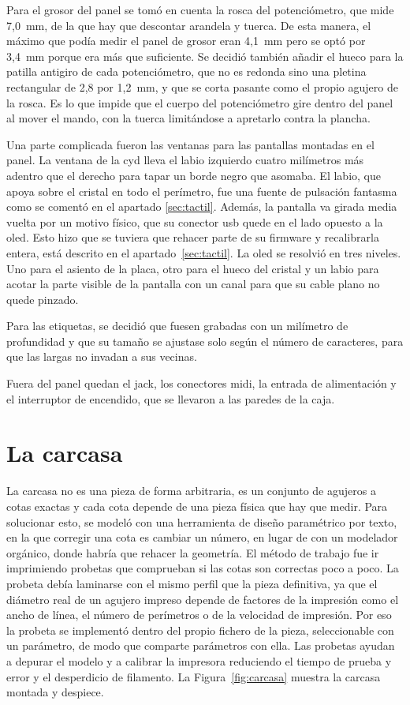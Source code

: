 Para el grosor del panel se tomó en cuenta la rosca del potenciómetro, que mide
7,0~mm, de la que hay que descontar arandela y tuerca. De esta manera, el máximo
que podía medir el panel de grosor eran 4,1~mm pero se optó por 3,4~mm porque era
más que suficiente. Se decidió también añadir el hueco para la patilla antigiro de
cada potenciómetro, que no es redonda sino una pletina rectangular de
2,8 por 1,2~mm, y que se corta pasante como el propio agujero de la rosca. Es
lo que impide que el cuerpo del potenciómetro gire dentro del panel al mover el
mando, con la tuerca limitándose a apretarlo contra la plancha.

Una parte complicada fueron las ventanas para las pantallas montadas en el panel.
La ventana de la \gls{cyd} lleva el labio izquierdo cuatro milímetros más adentro 
que el derecho para tapar un borde negro que asomaba. El labio, que apoya sobre el 
cristal en todo el perímetro, fue una fuente de pulsación fantasma como se comentó 
en el apartado \ref{sec:tactil}. Además, la pantalla va girada media 
vuelta por un motivo físico, que su conector \gls{usb} quede en el lado opuesto a la 
\gls{oled}. Esto hizo que se tuviera que rehacer parte de su firmware y recalibrarla 
entera, está descrito en el apartado~\ref{sec:tactil}.
La \gls{oled} se resolvió en tres niveles. Uno para el asiento de la placa, otro para
el hueco del cristal y un labio para acotar la parte visible de la pantalla con un canal 
para que su cable plano no quede pinzado. 

Para las etiquetas, se decidió que fuesen grabadas con un milímetro de
profundidad y que su tamaño se ajustase solo según el número de caracteres, para que
las largas no invadan a sus vecinas.

Fuera del panel quedan el jack, los conectores \gls{midi}, la entrada de
alimentación y el interruptor de encendido, que se llevaron a las paredes de la caja.

\section{La carcasa}
\label{sec:carcasa}

La carcasa no es una pieza de forma arbitraria, es un conjunto de agujeros a cotas
exactas y cada cota depende de una pieza física que hay que medir. Para solucionar esto, se
modeló con una herramienta de diseño paramétrico por texto, en la que corregir
una cota es cambiar un número, en lugar de con un modelador orgánico, donde
habría que rehacer la geometría. El método de trabajo fue ir imprimiendo probetas 
que comprueban si las cotas son correctas poco a poco. La probeta debía laminarse con el
mismo perfil que la pieza definitiva, ya que el diámetro real de un agujero
impreso depende de factores de la impresión como el ancho de línea, el número de perímetros 
o de la velocidad de impresión. Por eso la probeta se implementó dentro del propio fichero 
de la pieza, seleccionable con un parámetro, de modo que comparte parámetros con ella. 
Las probetas ayudan a depurar el modelo y a calibrar la impresora reduciendo el
tiempo de prueba y error y el desperdicio de filamento. La Figura~\ref{fig:carcasa} muestra 
la carcasa montada y despiece.

